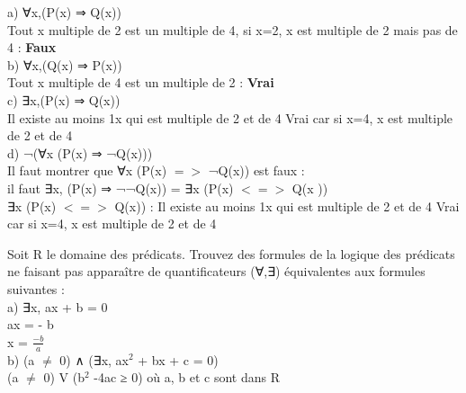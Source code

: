 a) ∀x,(P(x) ⇒ Q(x)) \\

Tout x multiple de 2 est un multiple de 4, si x=2, x est multiple de 2 mais pas de 4 : \textbf{Faux} \\

b) ∀x,(Q(x) ⇒ P(x)) \\

Tout x multiple de 4 est un multiple de 2 : \textbf{Vrai} \\

\newpage
c) ∃x,(P(x) ⇒ Q(x)) \\

Il existe au moins 1x qui est multiple de 2 et de 4 Vrai car si x=4, x est multiple de 2 et de 4 \\

d) ¬(∀x (P(x) ⇒ ¬Q(x))) \\

Il faut montrer que ∀x (P(x) $=>$ ¬Q(x)) est faux : \\

il faut ∃x, (P(x) ⇒ ¬¬Q(x)) = ∃x (P(x) $<=>$ Q(x )) \\

∃x (P(x) $<=>$ Q(x)) : Il existe au moins 1x qui est multiple de 2 et de 4 Vrai car si x=4, x est multiple de 2 et de 4 \\

\vspace{6mm}

Soit R le domaine des prédicats. Trouvez des formules de la logique des prédicats ne faisant pas apparaître de quantificateurs (∀,∃) équivalentes aux formules suivantes : \\

a) ∃x, ax + b = 0 \\

ax = - b \\
x = $\frac{-b}{a}$ \\

b) (a $\neq$ 0) ∧ (∃x, ax$^{2}$ + bx + c = 0) \\

(a $\neq$ 0) V (b$^{2}$ -4ac ≥ 0) où a, b et c sont dans R
